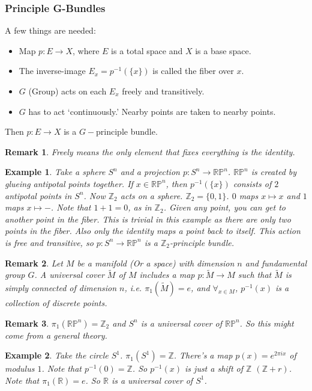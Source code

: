 \documentclass[oneside]{book}
\theoremstyle{mystyle}
\newtheorem{example}{Example}[section]
\newtheorem{remark}{Remark}[section]
\begin{document}
\subsubsection{Principle G-Bundles}
A few things are needed:
\begin{itemize}
    \item Map $p:E\rightarrow X$, where $E$ is a total space and $X$ is a base space.
    \item The inverse-image $E_{x} = p^{-1}(\{x\})$ is called the fiber over $x$.
    \item $G$ (Group) acts on each $E_{x}$ freely and transitively.
    \item $G$ has to act `continuously.' Nearby points are taken to nearby points.
\end{itemize}
Then $p:E\rightarrow X$ is a $G-$principle bundle.
\begin{remark}
Freely means the only element that fixes everything is the identity.
\end{remark}
\begin{example}
Take a sphere $S^{n}$ and a projection $p:S^{n} \rightarrow \mathbb{RP}^{n}$. $\mathbb{RP}^{n}$ is created by glueing antipotal points together. If $x\in \mathbb{RP}^{n}$, then $p^{-1}(\{x\})$ consists of $2$ antipotal points in $S^{n}$. Now $\mathbb{Z}_{2}$ acts on a sphere. $\mathbb{Z}_{2} = \{0,1\}$. $0$ maps $x \mapsto x$ and $1$ maps $x\mapsto -$. Note that $1+1 = 0$, as in $\mathbb{Z}_{2}$. Given any point, you can get to another point in the fiber. This is trivial in this example as there are only two points in the fiber. Also only the identity maps a point back to itself. This action is free and transitive, so $p:S^{n} \rightarrow \mathbb{RP}^{n}$ is a $\mathbb{Z}_{2}$-principle bundle.
\end{example}
\begin{remark}
Let $M$ be a manifold (Or a space) with dimension $n$ and fundamental group $G$. A universal cover $\tilde{M}$ of $M$ includes a map $p:\tilde{M}\rightarrow M$ such that $\tilde{M}$ is simply connected of dimension $n$, i.e. $\pi_{1}(\tilde{M}) = e$, and $\forall_{x\in M}$, $p^{-1}(x)$ is a collection of discrete points.
\end{remark}
\begin{remark}
$\pi_{1}(\mathbb{RP}^{n}) = \mathbb{Z}_{2}$ and $S^{n}$ is a universal cover of $\mathbb{RP}^{n}$. So this might come from a general theory.
\end{remark}
\begin{example}
Take the circle $S^{1}$. $\pi_{1}(S^{1}) = \mathbb{Z}$. There's a map $p(x) = e^{2\pi i x}$ of modulus $1$. Note that $p^{-1}(0) = \mathbb{Z}$. So $p^{-1}(x)$ is just a shift of $\mathbb{Z}$ $(\mathbb{Z}+r)$. Note that $\pi_{1}(\mathbb{R}) = e$. So $\mathbb{R}$ is a universal cover of $S^{1}$.
\end{example}
\end{document}
